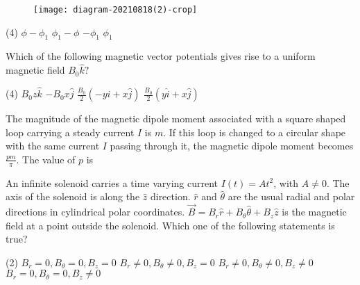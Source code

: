 \begin{enumerate}
\begin{minipage}{\textwidth}
	\begin{figure}[H]
		\centering
		\texttt{[image: diagram-20210818(2)-crop]}
	\end{figure}
\end{minipage}
\begin{tasks}(4)
	\task[\textbf{A.}] $\phi-\phi_{1}$
	\task[\textbf{B.}] $\phi_{1}-\phi$
	\task[\textbf{C.}]$-\phi_{1}$
	\task[\textbf{D.}] $\phi_{1}$
\end{tasks}
\begin{minipage}{\textwidth}
	\item Which of the following magnetic vector potentials gives rise to a uniform magnetic field $B_{0} \hat{k} ?$
\end{minipage}
\begin{tasks}(4)
	\task[\textbf{A.}] $B_{0} z \hat{k}$
	\task[\textbf{B.}]$-B_{0} x \hat{j}$
	\task[\textbf{C.}]$\frac{B_{0}}{2}(-y \hat{i}+x \hat{j})$
	\task[\textbf{D.}]$\frac{B_{0}}{2}(y \hat{i}+x \hat{j})$
\end{tasks}
\begin{minipage}{\textwidth}
	\item The magnitude of the magnetic dipole moment associated with a square shaped loop carrying a steady current $I$ is $m$. If this loop is changed to a circular shape with the same current $I$ passing through it, the magnetic dipole moment becomes $\frac{p m}{\pi} .$ The value of $p$ is
\end{minipage}
\begin{minipage}{\textwidth}
	\item An infinite solenoid carries a time varying current $I(t)=A t^{2}$, with $A \neq 0 .$ The axis of the solenoid is along the $\hat{z}$ direction. $\hat{r}$ and $\hat{\theta}$ are the usual radial and polar directions in cylindrical polar coordinates. $\vec{B}=B_{r} \hat{r}+B_{\theta} \hat{\theta}+B_{z} \hat{z}$ is the magnetic field at a point outside the solenoid. Which one of the following statements is true?
\end{minipage}
\begin{tasks}(2)
	\task[\textbf{A.}] $B_{r}=0, B_{\theta}=0, B_{z}=0$
	\task[\textbf{B.}]$B_{r} \neq 0, B_{\theta} \neq 0, B_{z}=0$
	\task[\textbf{C.}] $B_{r} \neq 0, B_{\theta} \neq 0, B_{z} \neq 0$
	\task[\textbf{D.}] $B_{r}=0, B_{\theta}=0, B_{z} \neq 0$
\end{tasks}
\begin{minipage}{\textwidth}

\end{minipage}
\end{enumerate}

